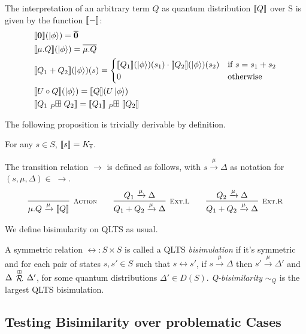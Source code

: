 The interpretation of an arbitrary term $Q$ as quantum distribution $\llbracket Q\rrbracket$ over S is given by the function $\llbracket{-}\rrbracket$:
\begin{align*}
	&\sem{\nil}(\ket{\phi}) = \overline{\nil}\\
	&\sem{\mu.Q}(\ket{\phi}) = \overline{\mu.Q}\\
	&\sem{Q_1 + Q_2}(\ket{\phi})(s) = 
	\begin{cases}
		\sem{Q_1}(\ket{\phi})(s_1) \cdot \sem{Q_2}(\ket{\phi})(s_2) & \text{if } s = s_1 + s_2\\
		0 & \text{otherwise}
	\end{cases}\\
	&\sem{U \circ Q}(\ket{\phi}) = \sem{Q}(U \ket{\phi})\\
	&\sem{Q_1 \qsum{P} Q_2} = \sem{Q_1} \qsum{P} \sem{Q_2}
\end{align*}

The following proposition is trivially derivable by definition.
\begin{proposition}
	For any $s \in S$, $\llbracket s\rrbracket = K_{\overline{s}}$.
\end{proposition}

The transition relation $\to$ is defined as follows, with $s \xrightarrow{\mu} \Delta$ as notation for $(s, \mu, \Delta) \in\;\to$.
\begin{gather*}
  \infer[\mbox{\footnotesize\scshape Action}]{\mu.Q \xrightarrow{\mu} \sem{Q}}{} \qquad 
  \infer[\mbox{\footnotesize\scshape Ext.L}]{Q_1 + Q_2 \xrightarrow{\mu} \Delta}{Q_1 \xrightarrow{\mu} \Delta} \qquad
  \infer[\mbox{\footnotesize\scshape Ext.R}]{Q_1 + Q_2 \xrightarrow{\mu} \Delta}{Q_2 \xrightarrow{\mu} \Delta}
\end{gather*}

We define bisimularity on QLTS as usual.
\begin{definition}
	A symmetric relation $\rel : S \times S$ is called a QLTS \emph{bisimulation} if it's symmetric and for each pair of states $s, s' \in S$ such that $s \rel s'$,
	if $s \xrightarrow{\mu} \Delta$ then $s' \xrightarrow{\mu} \Delta'$ and $\Delta\,\stackrel{\scriptscriptstyle \boxplus}{\mathcal{R}}\,\Delta'$, for some quantum distributions $\Delta' \in D(S)$.
	\emph{Q-bisimilarity} $\sim_Q$ is the largest QLTS bisimulation.
\end{definition}


\subsection{Testing Bisimilarity over problematic Cases}

